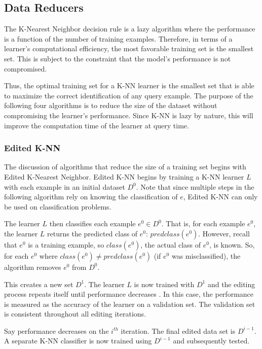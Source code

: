 \documentclass[twoside,11pt]{article}
\begin{document}
\subsection{Data Reducers}
The K-Nearest Neighbor decision rule is a lazy algorithm where the performance is a function of the number of training examples. Therefore, in terms of a learner's computational efficiency, the most favorable training set is the smallest set.
This is subject to the constraint that the model's performance is not compromised.

Thus, the optimal training set for a K-NN learner is the smallest set that is able to maximize the correct identification of any query example.
The purpose of the following four algorithms is to reduce the size of the dataset without compromising the learner's performance. Since K-NN is lazy by nature, this will improve the computation time of the learner at query time.


\subsubsection{Edited K-NN}
The discussion of algorithms that reduce the size of a training set begins with Edited K-Nearest Neighbor. Edited K-NN begins by training a K-NN learner $L$ with each example in an initial dataset $D^0$. Note that since multiple steps in the following algorithm rely on knowing the classification of $e$, Edited K-NN can only be used on classification problems.

The learner $L$ then classifies each example $e^0 \in D^0$. That is, for each example $e^0$, the learner $L$ returns the predicted class of $e^0$: $predclass(e^0)$. However, recall that $e^0$ is a training example, so $class(e^0)$, the actual class of $e^0$, is known. So, for each $e^0$ where $class(e^0) \neq predclass(e^0)$ (if $e^0$ was misclassified), the algorithm removes $e^0$ from $D^0$.

This creates a new set $D^1$. The learner $L$ is now trained with $D^1$ and the editing process repeats itself until performance decreases \citep{edited}. In this case, the performance is measured as the accuracy of the learner on a validation set. The validation set is consistent throughout all editing iterations.

Say performance decreases on the $i^{th}$ iteration. The final edited data set is $D^{i-1}$. A separate K-NN classifier is now trained using $D^{i-1}$ and subsequently tested.
\end{document}
